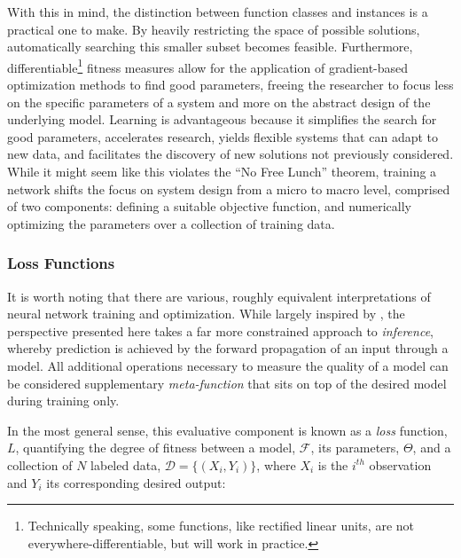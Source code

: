 With this in mind, the distinction between function classes and instances is a practical one to make.
By heavily restricting the space of possible solutions, automatically searching this smaller subset becomes feasible.
Furthermore, differentiable\footnote{Technically speaking, some functions, like rectified linear units, are not everywhere-differentiable, but will work in practice.} fitness measures allow for the application of gradient-based optimization methods to find good parameters, freeing the researcher to focus less on the specific parameters of a system and more on the abstract design of the underlying model.
Learning is advantageous because it simplifies the search for good parameters, accelerates research, yields flexible systems that can adapt to new data, and facilitates the discovery of new solutions not previously considered.
While it might seem like this violates the ``No Free Lunch'' theorem, training a network shifts the focus on system design from a micro to macro level, comprised of two components: defining a suitable objective function, and numerically optimizing the parameters over a collection of training data.


\subsubsection{Loss Functions}

It is worth noting that there are various, roughly equivalent interpretations of neural network training and optimization.
While largely inspired by \cite{LeCun2006Tutorial}, the perspective presented here takes a far more constrained approach to \emph{inference}, whereby prediction is achieved by the forward propagation of an input through a model.
All additional operations necessary to measure the quality of a model can be considered supplementary \emph{meta-function} that sits on top of the desired model during training only.

In the most general sense, this evaluative component is known as a \emph{loss} function, $L$, quantifying the degree of fitness between a model, $\mathcal{F}$, its parameters, $\Theta$, and a collection of $N$ labeled data, $\mathcal{D} = \{(X_i, Y_i) \}$, where $X_i$ is the $i^{th}$ observation and $Y_i$ its corresponding desired output:

